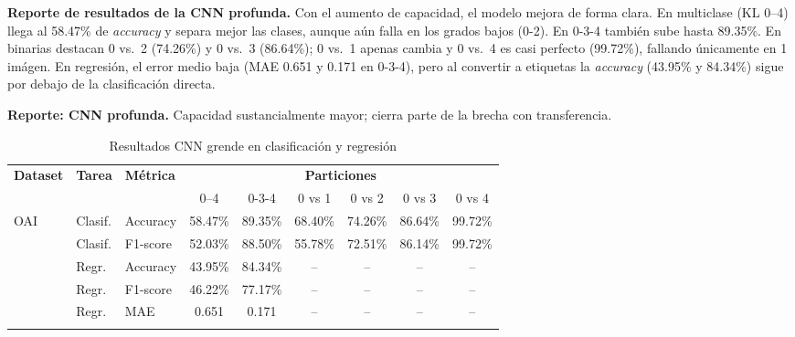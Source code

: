 \documentclass[11pt,spanish,listoffigures,listoftables]{tfgetsinf}
\begin{document}
\noindent\textbf{Reporte de resultados de la CNN profunda.} Con el aumento de capacidad, el modelo mejora de forma clara. En multiclase (KL 0--4) llega al 58.47\% de \textit{accuracy} y separa mejor las clases, aunque aún falla en los grados bajos (0-2). En 0-3-4 también sube hasta 89.35\%. En binarias destacan 0 vs.\ 2 (74.26\%) y 0 vs.\ 3 (86.64\%); 0 vs.\ 1 apenas cambia y 0 vs.\ 4 es casi perfecto (99.72\%), fallando únicamente en 1 imágen. En regresión, el error medio baja (MAE 0.651 y 0.171 en 0-3-4), pero al convertir a etiquetas la \textit{accuracy} (43.95\% y 84.34\%) sigue por debajo de la clasificación directa.


\medskip
\noindent\textbf{Reporte: CNN profunda.} Capacidad sustancialmente mayor; cierra parte de la brecha con transferencia.
\begin{table}[H]
	\centering
	\caption{Resultados CNN grende en clasificación y regresión}
	\label{tab:cnn_grande_results}
	\begin{tabular}{@{} l l l c c c c c c @{}}
		\toprule
		\textbf{Dataset} & \textbf{Tarea}                           & \textbf{Métrica}
		                 & \multicolumn{6}{c}{\textbf{Particiones}}                                                                                \\
		\cmidrule(lr){4-9}
		                 &                                          &                  & 0--4    & 0-3-4   & 0 vs 1  & 0 vs 2  & 0 vs 3  & 0 vs 4  \\
		\midrule
		\multirow{2}{*}{OAI}
		                 & Clasif.                                  & Accuracy         & 58.47\% & 89.35\% & 68.40\% & 74.26\% & 86.64\% & 99.72\% \\
		                 & Clasif.                                  & F1-score         & 52.03\% & 88.50\% & 55.78\% & 72.51\% & 86.14\% & 99.72\% \\
		\addlinespace
		\multirow{3}{*}{OAI}
		                 & Regr.                                    & Accuracy         & 43.95\% & 84.34\% & --      & --      & --      & --      \\
		                 & Regr.                                    & F1-score         & 46.22\% & 77.17\% & --      & --      & --      & --      \\
		                 & Regr.                                    & MAE              & 0.651   & 0.171   & --      & --      & --      & --      \\
		\addlinespace
	\end{tabular}
\end{table}
\end{document}
